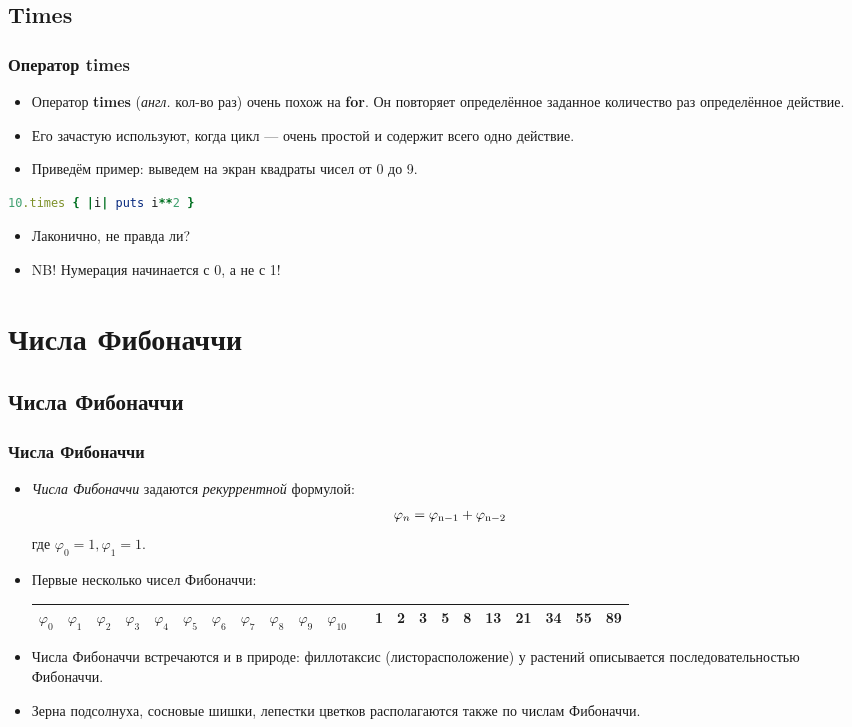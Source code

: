 \documentclass[compress,red]{beamer}
\begin{document}
\subsection{Times}
\begin{frame}[fragile]
  \frametitle{Оператор times}
  \begin{itemize}
    \item Оператор \textbf{times} (\emph{англ.} кол-во раз) очень похож на \textbf{for}. Он повторяет определённое заданное количество раз определённое действие.
    \item Его зачастую используют, когда цикл --- очень простой и содержит всего одно действие.
    \item Приведём пример: выведем на экран квадраты чисел от 0 до 9.
  \end{itemize}
  \begin{lstlisting}[language=ruby,numbersep=2pt,label=ruby10,caption=Вычисление наименьшей степени]
    10.times { |i| puts i**2 }
  \end{lstlisting}
  \begin{itemize}
    \item Лаконично, не правда ли?
    \item NB! Нумерация начинается с 0, а не с 1!
  \end{itemize}
  
\end{frame}

\section{Числа Фибоначчи}
\subsection{Числа Фибоначчи}
\begin{frame}[fragile]
  \frametitle{Числа Фибоначчи}
	\begin{itemize}
		\item \emph{Числа Фибоначчи} задаются \emph{рекуррентной} формулой:
		  \begin{gather*}
		    \varphi_n = \varphi_{\rm{n}-1}+\varphi_{\rm{n}-2}
		  \end{gather*}
		  где $\varphi_0 = 1, \varphi_1 = 1$.
		\item Первые несколько чисел Фибоначчи:
		  \begin{tabular}{|c|c|c|c|c|c|c|c|c|c|c|}
		  \hline
		  $\varphi_0$ & $\varphi_1$ & $\varphi_2$ & $\varphi_3$ & $\varphi_4$ & $\varphi_5$ & $\varphi_6$ & $\varphi_7$ & $\varphi_8$ & $\varphi_9$ & $\varphi_{10}$ &  
		   & 1 & 2 & 3 & 5 & 8 & 13 & 21 & 34 & 55 & 89 \\
		  \hline
		  \end{tabular}
		\item Числа Фибоначчи встречаются и в природе: филлотаксис (листорасположение) у растений описывается последовательностью Фибоначчи. 
		\item Зерна подсолнуха, сосновые шишки, лепестки цветков располагаются также по числам Фибоначчи.
  \end{itemize}  
\end{frame}
\end{document}
